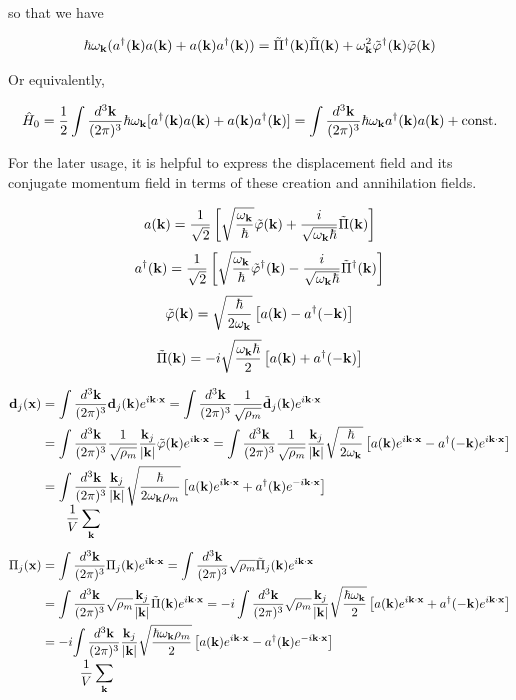 so that we have

\[\hbar\omega_{\bf k}(a^\dagger({\bf k})a({\bf k}) + a({\bf k})a^\dagger({\bf k})) = \tilde\Pi^\dagger({\bf k})\tilde\Pi({\bf k}) + \omega_{\bf k}^2\tilde\varphi^\dagger({\bf k})\tilde\varphi({\bf k}) \]

Or equivalently,

\[\hat{H}_0 = \frac{1}{2}\int\frac{d^3\bf k}{(2\pi)^3}\hbar\omega_{\bf k}[a^\dagger({\bf k})a({\bf k}) + a({\bf k})a^\dagger({\bf k})] = \int\frac{d^3\bf k}{(2\pi)^3}\hbar\omega_{\bf k}a^\dagger({\bf k})a({\bf k}) + \text{const.} \]

For the later usage, it is helpful to express the displacement field and its conjugate momentum field in terms of these creation and annihilation fields.

\[a({\bf k}) = \frac{1}{\sqrt{2}}\left[\sqrt{\frac{\omega_{\bf k}}{\hbar}}\tilde\varphi({\bf k}) + \frac{i}{\sqrt{\omega_{\bf k}\hbar}}\tilde\Pi({\bf k})\right] \]
\[a^\dagger({\bf k}) = \frac{1}{\sqrt{2}}\left[\sqrt{\frac{\omega_{\bf k}}{\hbar}}\tilde\varphi^\dagger({\bf k}) - \frac{i}{\sqrt{\omega_{\bf k}\hbar}}\tilde\Pi^\dagger({\bf k})\right] \]
\[\tilde\varphi({\bf k}) = \sqrt{\frac{\hbar}{2\omega_{\bf k}}}\left[a({\bf k}) - a^\dagger({-\bf k})\right] \]
\[\tilde\Pi({\bf k}) = -i\sqrt{\frac{\omega_{\bf k}\hbar}{2}}\left[a({\bf k}) + a^\dagger({-\bf k})\right] \]

\[\begin{split}
{\bf d}_j({\bf x}) &= \int\frac{d^3\bf k}{(2\pi)^3} {\bf d}_j({\bf k})e^{i\bf k\cdot x} = \int\frac{d^3\bf k}{(2\pi)^3}\frac{1}{\sqrt{\rho_m}}\tilde{\bf d}_j({\bf k})e^{i\bf k\cdot x}\\
&=\int\frac{d^3\bf k}{(2\pi)^3}\frac{1}{\sqrt{\rho_m}}\frac{{\bf k}_j}{|{\bf k}|}\tilde\varphi({\bf k})e^{i\bf k\cdot x} = \int\frac{d^3\bf k}{(2\pi)^3}\frac{1}{\sqrt{\rho_m}}\frac{{\bf k}_j}{|{\bf k}|}\sqrt{\frac{\hbar}{2\omega_{\bf k}}}\left[a({\bf k})e^{i\bf k\cdot x}-a^\dagger(-{\bf k})e^{i\bf k\cdot x}\right]\\
&=\underset{\displaystyle\frac{1}{V}\sum_{\bf k}}{\int\frac{d^3\bf k}{(2\pi)^3}}\frac{{\bf k}_j}{|{\bf k}|}\sqrt{\frac{\hbar}{2\omega_{\bf k}\rho_m}}\left[a({\bf k})e^{i\bf k\cdot x}+a^\dagger({\bf k})e^{-i\bf k\cdot x}\right]
\end{split}\]
\[\begin{split}
\Pi_j({\bf x}) &= \int\frac{d^3\bf k}{(2\pi)^3} {\Pi}_j({\bf k})e^{i\bf k\cdot x} = \int\frac{d^3\bf k}{(2\pi)^3}\sqrt{\rho_m}\tilde{\Pi}_j({\bf k})e^{i\bf k\cdot x}\\
&=\int\frac{d^3\bf k}{(2\pi)^3}\sqrt{\rho_m}\frac{{\bf k}_j}{|{\bf k}|}\tilde\Pi({\bf k})e^{i\bf k\cdot x} = -i\int\frac{d^3\bf k}{(2\pi)^3}\sqrt{\rho_m}\frac{{\bf k}_j}{|{\bf k}|}\sqrt{\frac{\hbar\omega_{\bf k}}{2}}\left[a({\bf k})e^{i\bf k\cdot x}+a^\dagger(-{\bf k})e^{i\bf k\cdot x}\right]\\
&=-i\underset{\displaystyle\frac{1}{V}\sum_{\bf k}}{\int\frac{d^3\bf k}{(2\pi)^3}}\frac{{\bf k}_j}{|{\bf k}|}\sqrt{\frac{\hbar\omega_{\bf k}\rho_m}{2}}\left[a({\bf k})e^{i\bf k\cdot x}-a^\dagger({\bf k})e^{-i\bf k\cdot x}\right]
\end{split}\]

